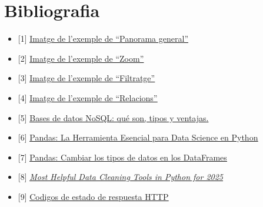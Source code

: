 \documentclass[a4paper,12pt]{report}
\begin{document}
\section*{Bibliografia}
\begin{itemize}
    \item \hypertarget{ref:biblio-pan-gen}{} [1] \href{https://evotic.es/wp-content/uploads/2022/10/dashboard_ventas.png}{\underline{Imatge de l'exemple de ``Panorama general''}}
    \item \hypertarget{ref:biblio-zoom}{} [2] \href{https://r-charts.com/es/correlacion/zoom-grafico_files/figure-html/zoom.png}{\underline{Imatge de l'exemple de ``Zoom''}}
    \item \hypertarget{ref:biblio-filtre}{} [3] \href{https://cdn.exceltotal.com/wp-content/uploads/2014/02/filtros-en-excel-03.png}{\underline{Imatge de l'exemple de ``Filtratge''}}
    \item \hypertarget{ref:biblio-relacions}{} [4] \href{https://cdn.kastatic.org/ka-perseus-images/8aa21944eef2879cea9080a2ae2fbcb98cec0ddf.png}{\underline{Imatge de l'exemple de ``Relacions''}}
    \item \hypertarget{ref:biblio-nosql}{} [5] \href{https://www.arsys.es/blog/bases-de-datos-nosql-que-son-tipos-y-ventajas#tree-3}{\underline{Bases de datos NoSQL: qué son, tipos y ventajas}.}
    \item \hypertarget{ref:biblio-pandas-basic}{} [6] \href{https://iddigitalschool.com/bootcamps/que-es-pandas/#:~:text=Funcionalidades%20Clave,filtrar%2C%20agregar%20y%20resumir%20datos.}{\underline{Pandas: La Herramienta Esencial para Data Science en Python}}
    \item \hypertarget{ref:biblio-pandas-transform}{} [7] \href{https://www.analyticslane.com/2021/07/15/pandas-cambiar-los-tipos-de-datos-en-los-dataframes/}{\underline{Pandas: Cambiar los tipos de datos en los DataFrames}}
    \item \hypertarget{ref:biblio-data-cleaning}{} [8] \href{https://hevodata.com/learn/guide-to-effective-data-cleaning-tools-in-python/#:~:text=1.-,Pandas,your%20data%20for%20further%20exploration.}{\underline{\textit{Most Helpful Data Cleaning Tools in Python for 2025}}}
    \item \hypertarget{ref:biblio-http}{} [9] \href{https://developer.mozilla.org/es/docs/Web/HTTP/Status}{\underline{Codigos de estado de respuesta HTTP}}
\end{itemize}
\end{document}
